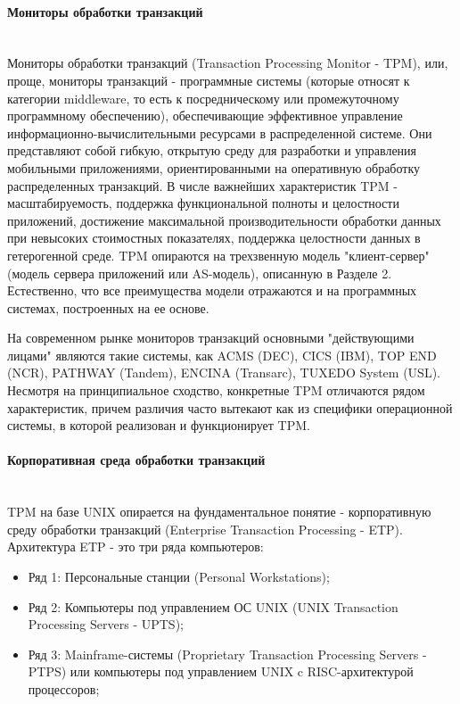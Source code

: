 \paragraph{Мониторы обработки транзакций}~\\
Мониторы обработки транзакций (Transaction Processing Monitor - TPM), или, проще, мониторы
транзакций - программные системы (которые относят к категории middleware, то есть к посредническому
или промежуточному программному обеспечению), обеспечивающие эффективное управление информационно-вычислительными
ресурсами в распределенной системе. Они представляют собой гибкую, открытую среду для разработки и
управления мобильными приложениями, ориентированными на оперативную обработку распределенных транзакций.
В числе важнейших характеристик TPM - масштабируемость, поддержка функциональной полноты и целостности
приложений, достижение максимальной производительности обработки данных при невысоких стоимостных
показателях, поддержка целостности данных в гетерогенной среде. TPM опираются на трехзвенную
модель "клиент-сервер" (модель сервера приложений или AS-модель), описанную в Разделе 2.
Естественно, что все преимущества модели отражаются и на программных системах, построенных на ее основе.

На современном рынке мониторов транзакций основными "действующими лицами" являются такие системы,
как ACMS (DEC), CICS (IBM), TOP END (NCR), PATHWAY (Tandem), ENCINA (Transarc), TUXEDO System (USL).
Несмотря на принципиальное сходство, конкретные TPM отличаются рядом характеристик, причем
различия часто вытекают как из специфики операционной системы, в которой реализован и функционирует TPM.

\paragraph{Корпоративная среда обработки транзакций}~\\

TPM на базе UNIX опирается на фундаментальное понятие - корпоративную среду обработки транзакций
(Enterprise Transaction Processing - ETP). Архитектура ETP - это три ряда компьютеров:
\begin{itemize}
    \item Ряд 1: Персональные станции (Personal Workstations);
    \item Ряд 2: Компьютеры под управлением ОС UNIX (UNIX Transaction Processing Servers - UPTS);
    \item Ряд 3: Mainframe-системы (Proprietary Transaction Processing Servers - PTPS)
    или компьютеры под управлением UNIX c RISC-архитектурой процессоров;
\end{itemize}

